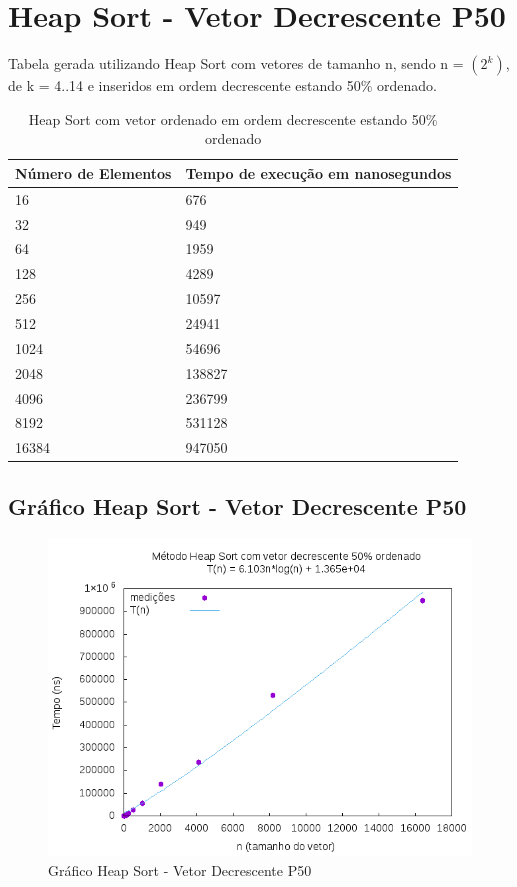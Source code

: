 \documentclass[12pt,a4paper,twoside]{report}
\begin{document}
\section{Heap Sort - Vetor Decrescente P50}
Tabela gerada utilizando Heap Sort com vetores de tamanho n, sendo n = $(2^k)$, de k = 4..14 e inseridos em ordem decrescente estando 50\% ordenado.
\begin{table}[H]
\centering
\caption{Heap Sort com vetor ordenado em ordem decrescente estando 50\% ordenado}
\label{my-label}
\begin{tabular}{|l|l|}
\hline
\multicolumn{1}{|c|}{\textbf{Número de Elementos}} & \multicolumn{1}{c|}{\textbf{Tempo de execução em nanosegundos}} \\ \hline
16 & 676 \\ \hline
32 & 949 \\ \hline
64 & 1959 \\ \hline
128 & 4289 \\ \hline
256 & 10597 \\ \hline
512 & 24941 \\ \hline
1024 & 54696 \\ \hline
2048 & 138827 \\ \hline
4096 & 236799 \\ \hline
8192 & 531128 \\ \hline
16384 & 947050 \\ \hline
\end{tabular}
\end{table}

\subsection{Gráfico Heap Sort - Vetor Decrescente P50}
\begin{figure}[H]
    \centering
    \includegraphics[width=0.7\linewidth]{graficos/HeapSort/vIntDecrescenteP50/vIntDecrescenteP50.png}
  \caption{Gráfico Heap Sort - Vetor Decrescente P50}
\end{figure}
\end{document}
